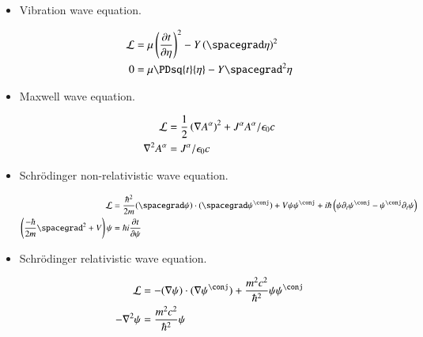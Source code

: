 \documentclass{article}
\begin{document}
\begin{itemize}

\item Vibration wave equation.

\begin{align*}
\LL &= \mu \left( \PD{t}{\eta} \right)^2 - Y \left( \spacegrad \eta \right)^2 \\
0 &= \mu \PDsq{t}{\eta} - Y \spacegrad^2 {\eta}
\end{align*}

\item Maxwell wave equation.

\begin{align*}
\mathcal{L} &= \frac{1}{2} \left( \nabla {A^\alpha} \right)^2 + J^\alpha A^\alpha / \epsilon_0 c \\
\nabla^2 A^\alpha &= J^\alpha/\epsilon_0 c 
\end{align*}

\item Schr\"{o}dinger non-relativistic wave equation.

\begin{align*}
\LL &= \frac{\hbar^2}{2m}
(\spacegrad \psi) \cdot (\spacegrad \psi^\conj) + V \psi \psi^\conj + {i \hbar} \left( \psi \partial_t \psi^\conj - \psi^\conj \partial_t \psi \right) \\
\left( \frac{-\hbar}{2m} \spacegrad^2 + V \right) \psi &= \hbar i \PD{t}{\psi}
\end{align*}

\item Schr\"{o}dinger relativistic wave equation.

\begin{align*}
\LL &= -(\grad \psi) \cdot (\grad \psi^\conj) + \frac{m^2 c^2}{\hbar^2} \psi \psi^\conj \\
-\grad^2 \psi &= \frac{m^2 c^2}{\hbar^2} \psi
\end{align*}

\end{itemize}



\end{document}
